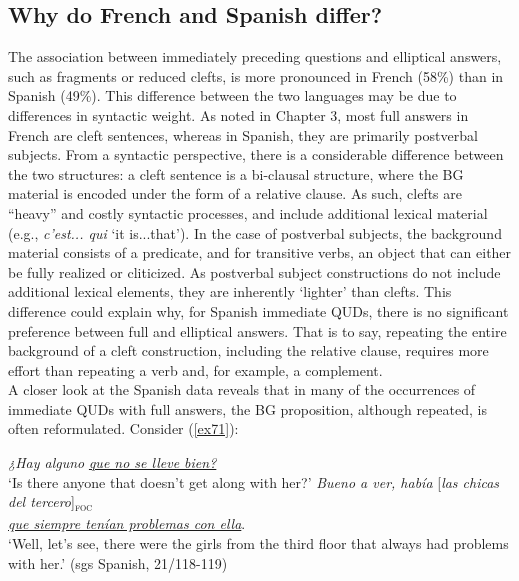 \subsection{Why do French and Spanish differ?}
The association between immediately preceding questions and elliptical answers, such as fragments or reduced clefts, is more pronounced in French (58\%) than in Spanish (49\%). This difference between the two languages may be due to differences in syntactic weight. As noted in Chapter 3, most full answers in French are cleft sentences, whereas in Spanish, they are primarily postverbal subjects. From a syntactic perspective, there is a considerable difference between the two structures: a cleft sentence is a bi-clausal structure, where the BG material is encoded under the form of a relative clause. As such, clefts are ``heavy” and costly syntactic processes, and include additional lexical material (e.g., \textit{c'est... qui} `it is...that').
In the case of postverbal subjects, the background material consists of a predicate, and for transitive verbs, an object that can either be fully realized or cliticized. As postverbal subject constructions do not include additional lexical elements, they are inherently `lighter' than clefts. This difference could explain why, for Spanish immediate QUDs, there is no significant preference between full and elliptical answers. That is to say, repeating the entire background of a cleft construction, including the relative clause, requires more effort than repeating a verb and, for example, a complement.\\
A closer look at the Spanish data reveals that in many of the occurrences of immediate QUDs with full answers, the BG proposition, although repeated, is often reformulated. Consider (\ref{ex71}):

\ea \label{ex71}
\ea	\textit{¿Hay alguno} \uline{\textit{que no se lleve bien?}}\\
 ‘Is there anyone that doesn't get along with her?'
\ex \textit{Bueno a ver, había} {[\textit{las chicas del tercero}]\textsubscript{\textsc{foc}}}\\
\normalsize \uline{\textit{que siempre tenían problemas con ella}}.\\
‘Well, let's see, there were the girls from the third floor that always had problems with her.' \hfill (sgs Spanish, 21/118-119)   
\z \z


